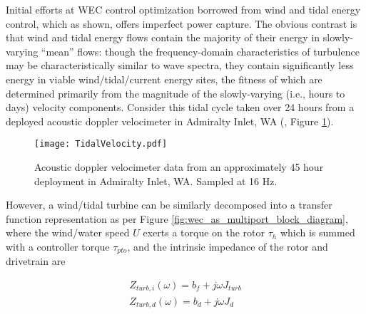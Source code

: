 Initial efforts at WEC control optimization borrowed from wind and tidal energy control, which as shown, offers imperfect power capture. The obvious contrast is that wind and tidal energy flows contain the majority of their energy in slowly-varying ``mean'' flows: though the frequency-domain characteristics of turbulence may be characteristically similar to wave spectra, they contain significantly less energy in viable wind/tidal/current energy sites, the fitness of which are determined primarily from the magnitude of the slowly-varying (i.e., hours to days) velocity components. Consider this tidal cycle taken over 24 hours from a deployed acoustic doppler velocimeter in Admiralty Inlet, WA (\cite{NREL2015}, Figure \ref{fig: TidalVelocity}). 

\begin{figure}
	\centering \texttt{[image: TidalVelocity.pdf]}
	\caption{Acoustic doppler velocimeter data from an approximately 45 hour deployment in Admiralty Inlet, WA. Sampled at 16 Hz.}
	\label{fig: TidalVelocity}
\end{figure}

However, a wind/tidal turbine can be similarly decomposed into a transfer function representation as per Figure \ref{fig:wec_as_multiport_block_diagram}, where the wind/water speed $U$ exerts a torque on the rotor $\tau_h$ which is summed with a controller torque $\tau_{pto}$, and the intrinsic impedance of the rotor and drivetrain are

\begin{subequations}
		
	\begin{gather}
		Z_{turb,i}(\omega)=b_f + j\omega J_{turb} \\
		Z_{turb,d}(\omega)=b_d + j\omega J_d
	\end{gather}
\end{subequations}

